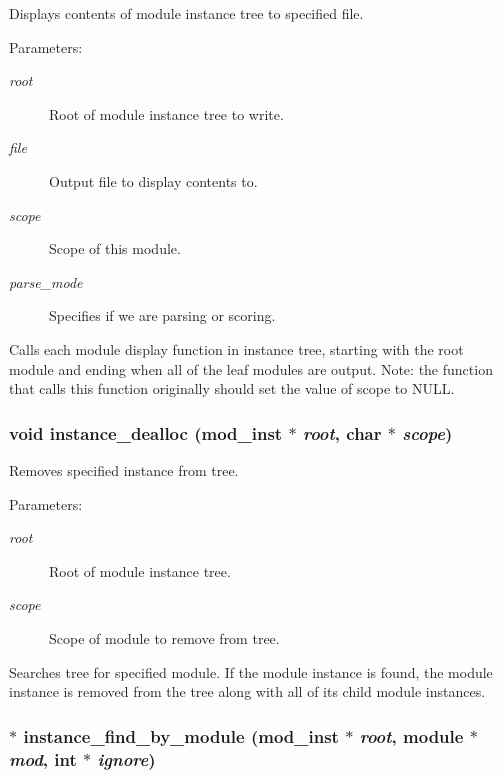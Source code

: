 Displays contents of module instance tree to specified file. 

\begin{Desc}
\item[Parameters:]
\begin{description}
\item[{\em root}]Root of module instance tree to write. \item[{\em file}]Output file to display contents to. \item[{\em scope}]Scope of this module. \item[{\em parse\_\-mode}]Specifies if we are parsing or scoring.\end{description}
\end{Desc}
Calls each module display function in instance tree, starting with the root module and ending when all of the leaf modules are output. Note: the function that calls this function originally should set the value of scope to NULL. 
\subsubsection{\setlength{\rightskip}{0pt plus 5cm}void instance\_\-dealloc ({\bf mod\_\-inst} $\ast$ {\em root}, char $\ast$ {\em scope})}\label{instance_8h_a6}


Removes specified instance from tree. 

\begin{Desc}
\item[Parameters:]
\begin{description}
\item[{\em root}]Root of module instance tree. \item[{\em scope}]Scope of module to remove from tree.\end{description}
\end{Desc}
Searches tree for specified module. If the module instance is found, the module instance is removed from the tree along with all of its child module instances. 
\subsubsection{$\ast$ instance\_\-find\_\-by\_\-module ({\bf mod\_\-inst} $\ast$ {\em root}, {\bf module} $\ast$ {\em mod}, int $\ast$ {\em ignore})}\label{instance_8h_a2}


